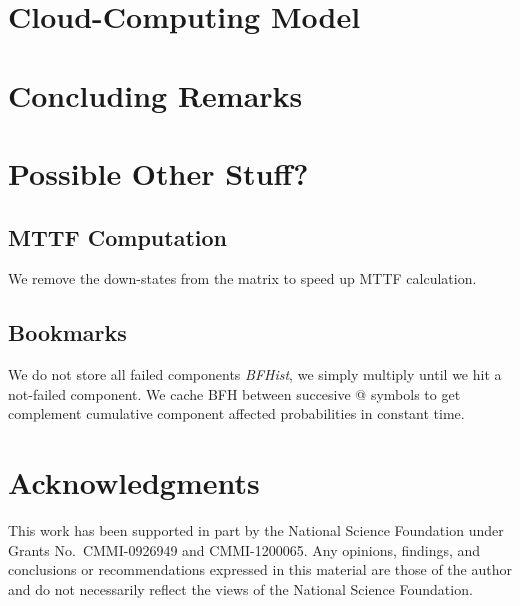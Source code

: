 \documentclass[12pt]{article}
\newcommand{\varName}[1]{\textrm{\it#1}}
\begin{document}
\section{Cloud-Computing Model}
\label{sec:cloud}



\section{Concluding Remarks}
\label{sec:conc}


\section{Possible Other Stuff?}
\subsection{MTTF Computation}
We remove the down-states from the matrix to speed up MTTF calculation.

\subsection{Bookmarks}
We do not store all failed components \varName{BFHist}, we simply multiply
until we hit a not-failed component. We cache BFH between succesive @  symbols
to get complement cumulative component affected probabilities in constant
time.


\section*{Acknowledgments}

This work has been supported
in part by
the National Science Foundation under
Grants No.\
CMMI-0926949 
and CMMI-1200065.
Any opinions, findings, and conclusions or recommendations
expressed in this material are those of the author and
do not necessarily reflect the views of the National
Science Foundation.




\end{document}
